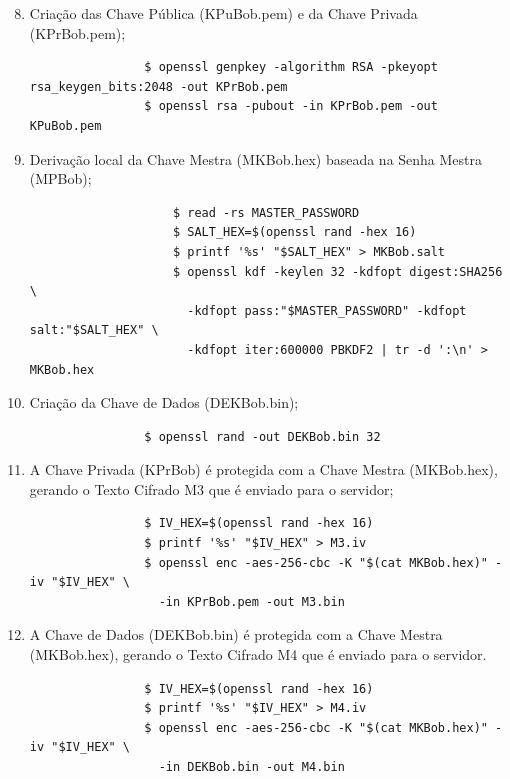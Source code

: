 \documentclass[12pt]{article}
\begin{document}
\begin{enumerate}
	\setcounter{enumi}{7} %
		\item Criação das Chave Pública (KPuBob.pem) e da Chave Privada (KPrBob.pem);
		\begin{tcolorbox}[width=\textwidth]
			{\scriptsize
				\begin{verbatim}
				$ openssl genpkey -algorithm RSA -pkeyopt rsa_keygen_bits:2048 -out KPrBob.pem
				$ openssl rsa -pubout -in KPrBob.pem -out KPuBob.pem
				\end{verbatim}
			}
		\end{tcolorbox}
		\item Derivação local da Chave Mestra (MKBob.hex) baseada na Senha Mestra (MPBob);
		\begin{tcolorbox}[width=\textwidth]
			{\scriptsize
				\begin{verbatim}
					$ read -rs MASTER_PASSWORD
					$ SALT_HEX=$(openssl rand -hex 16)
					$ printf '%s' "$SALT_HEX" > MKBob.salt
					$ openssl kdf -keylen 32 -kdfopt digest:SHA256 \
					  -kdfopt pass:"$MASTER_PASSWORD" -kdfopt salt:"$SALT_HEX" \
					  -kdfopt iter:600000 PBKDF2 | tr -d ':\n' > MKBob.hex
				\end{verbatim}
			}
		\end{tcolorbox}
		\item Criação da Chave de Dados (DEKBob.bin);
		\begin{tcolorbox}[width=\textwidth]
			{\scriptsize
				\begin{verbatim}
				$ openssl rand -out DEKBob.bin 32
				\end{verbatim}
			}
		\end{tcolorbox}
		\item A Chave Privada (KPrBob) é protegida com a Chave Mestra (MKBob.hex), gerando o Texto Cifrado M3 que é enviado para o servidor;
		\begin{tcolorbox}[width=\textwidth]
			{\scriptsize
				\begin{verbatim}
				$ IV_HEX=$(openssl rand -hex 16)
				$ printf '%s' "$IV_HEX" > M3.iv
				$ openssl enc -aes-256-cbc -K "$(cat MKBob.hex)" -iv "$IV_HEX" \
				  -in KPrBob.pem -out M3.bin
				\end{verbatim}
			}
		\end{tcolorbox}
		\item A Chave de Dados (DEKBob.bin) é protegida com a Chave Mestra (MKBob.hex), gerando o Texto Cifrado M4 que é enviado para o servidor.
		\begin{tcolorbox}[width=\textwidth]
			{\scriptsize
				\begin{verbatim}
				$ IV_HEX=$(openssl rand -hex 16)
				$ printf '%s' "$IV_HEX" > M4.iv
				$ openssl enc -aes-256-cbc -K "$(cat MKBob.hex)" -iv "$IV_HEX" \
				  -in DEKBob.bin -out M4.bin
				\end{verbatim}
			}
		\end{tcolorbox}
\end{enumerate}
\end{document}
